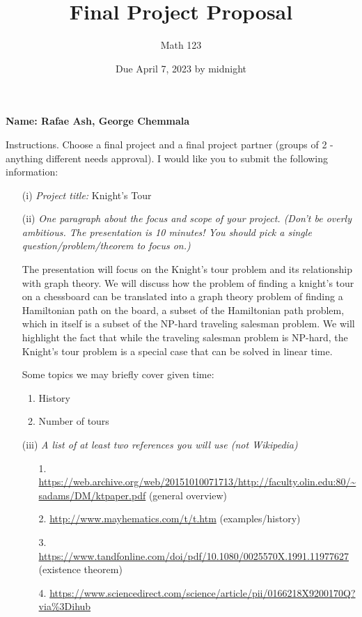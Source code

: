 \documentclass[11pt]{article}
\author{Math 123}
\date{Due April 7, 2023 by midnight}
\title{Final Project Proposal}
\begin{document}
\maketitle

{\bf\Large Name: Rafae Ash, George Chemmala} 


\vspace{.3in}
Instructions. Choose a final project and a final project partner (groups of 2 - anything different needs approval). I would like you to submit the following information:

\begin{enumerate}
	\item[(i)] \emph{Project title:} Knight's Tour
	\item[(ii)] \emph{One paragraph about the focus and scope of your project. (Don't be overly ambitious. The presentation is 10 minutes! You should pick a single question/problem/theorem to focus on.)}
		
		The presentation will focus on the Knight's tour problem and its relationship with graph theory. We will discuss how the problem of finding a knight's tour on a chessboard can be translated into a graph theory problem of finding a Hamiltonian path on the board, a subset of the Hamiltonian path problem, which in itself is a subset of the NP-hard traveling salesman problem. We will highlight the fact that while the traveling salesman problem is NP-hard, the Knight's tour problem is a special case that can be solved in linear time.

		Some topics we may briefly cover given time:
		\begin{enumerate}
			\item History
			\item Number of tours
		\end{enumerate}

	\item[(iii)] \emph{A list of at least two references you will use (not Wikipedia)}
		\begin{enumerate}
			\item[1.] \url{https://web.archive.org/web/20151010071713/http://faculty.olin.edu:80/~sadams/DM/ktpaper.pdf} (general overview)
			
			\item[2.] \url{http://www.mayhematics.com/t/t.htm} (examples/history)
			
			\item[3.] \url{https://www.tandfonline.com/doi/pdf/10.1080/0025570X.1991.11977627} (existence theorem)
			
			\item[4.] \url{https://www.sciencedirect.com/science/article/pii/0166218X9200170Q?via\%3Dihub}
		\end{enumerate}
\end{enumerate}
\end{document}
